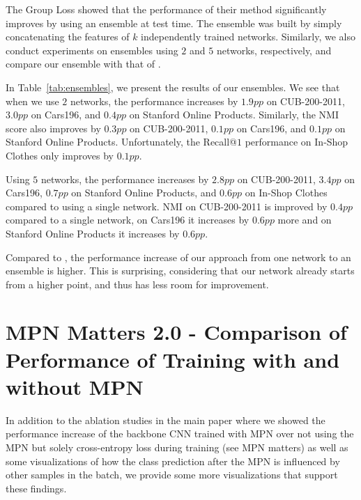 \documentclass{article}
\begin{document}
\iffalse
CUB-200-2011 & 72.2 & 74.3 & 73.1 & 74.4 \\
Cars196 & 90.9 & 74.9 & 91.5 & 75.4 \\
Stanford Online Products & 81.8 & 92.7 & 82.1 & 92.8 \\
In-Shop Clothes & 92.9 & - & 93.4 &  \\
\fi 


The Group Loss \cite{DBLP:conf/eccv/GrLoss} showed that the performance of their method significantly improves by using an ensemble at test time. The ensemble was built by simply concatenating the features of $k$ independently trained networks. Similarly, we also conduct experiments on ensembles using $2$ and $5$ networks, respectively, and compare our ensemble with that of \cite{DBLP:conf/eccv/GrLoss}.

In Table~\ref{tab:ensembles}, we present the results of our ensembles. We see that when we use $2$ networks, the performance increases by $1.9pp$ on CUB-200-2011, $3.0pp$ on Cars196, and $0.4pp$ on Stanford Online Products.  Similarly, the NMI score also improves by $0.3pp$ on CUB-200-2011, $0.1pp$ on Cars196, and $0.1pp$ on Stanford Online Products. Unfortunately, the Recall@$1$ performance on In-Shop Clothes only improves by $0.1pp$.

Using $5$ networks, the performance increases by $2.8pp$ on CUB-200-2011, $3.4pp$ on Cars196, $0.7pp$ on Stanford Online Products, and $0.6pp$ on In-Shop Clothes compared to using a single network. NMI on CUB-200-2011 is improved by $0.4pp$ compared to a single network, on Cars196 it increases by $0.6pp$ more and on Stanford Online Products it increases by $0.6pp$.

Compared to \cite{DBLP:conf/eccv/GrLoss}, the performance increase of our approach from one network to an ensemble is higher. This is surprising, considering that our network already starts from a higher point, and thus has less room for improvement.
\fi




\section{MPN Matters 2.0 - Comparison of Performance of Training with and without MPN}
\label{sec:MPN_matters}
In addition to the ablation studies in the main paper where we showed the performance increase of the backbone CNN trained with MPN over not using the MPN but solely cross-entropy loss during training (see MPN matters) as well as some visualizations of how the class prediction after the MPN is influenced by other samples in the batch, we provide some more visualizations that support these findings. 
\end{document}
